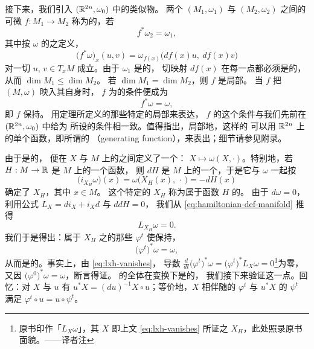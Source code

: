 接下来，我们引入 $(\mathbb{R}^{2n},\omega_0)$ 中\trSymplecticMapping{}的类似物。%
两个\trSymplecticManifold{} $(M_1,\omega_1)$ 与 $(M_2,\omega_2)$ 之间的%
可微\trMapping{} $f:M_1\to M_2$ 称为\trSymplectic{}的，若
\[
f^{*}\omega_2=\omega_1,
\]
其中按\trTwoForm{} $\omega$ 的\trPullback{}之定义，
\[
\bigl(f^{*}\omega\bigr)_x(u,v)=\omega_{f(x)}\bigl(df(x)u,\ df(x)v\bigr)
\]
对一切 $u$, $v\in T_xM$ 成立。由于 $\omega_1$ 是\trNondegenerate{}的，%
切映射 $df(x)$ 在每一点都必须是\trInjective{}的，从而 $\dim M_1\le\dim M_2$。%
若 $\dim M_1=\dim M_2$，则 $f$ 是局部\trDiffeomorphism。%
当 $f$ 把\trSymplecticManifold{} $(M,\omega)$ 映入其自身时，%
$f$ 为\trSymplectic{}的条件便成为
\[
f^{*}\omega=\omega,
\]
即 $f$ 保持\trSymplecticStructure。%
用\trDarboux{}定理所定义的那些特定的局部\trSymplecticCoordinates{}来表达，%
$f$ 的这个条件与我们先前在 $(\mathbb{R}^{2n},\omega_0)$ 中给\trMapping{}为\trSymplectic{}%
所设的条件相一致。值得指出，局部地，这样的\trSymplecticMapping%
可以用 $\mathbb{R}^{2n}$ 上的单个函数，即所谓的\textbf{\trGeneratingFunction}%
（generating function），来表出；细节请参见附录。

\trSymplecticStructure{}由于是\trNondegenerate{}的，%
便在\trVectorField{} $X$ 与 $M$ 上的\trOneForm{}之间定义了一个\trIsomorphism：%
$X\mapsto\omega(X,\cdot)$。特别地，若 $H:M\to\mathbb{R}$ 是 $M$ 上的一个\trSmooth{}函数，%
则 $dH$ 是 $M$ 上的一个\trOneForm，于是它与 $\omega$ 一起按
\begin{equation}\label{eq:hamiltonian-def-manifold}
\bigl(i_{X_H}\omega\bigr)(x)=\omega\bigl(X_H(x),\,\cdot\,\bigr)=-dH(x)
\end{equation}
确定了\trVectorField{} $X_H$，其中 $x\in M$。%
这个特定的\trVectorField{} $X_H$ 称为属于函数 $H$ 的\trHamiltonianVectorField。%
由于 $d\omega=0$，利用\trCartan{}公式 $L_X=di_X+i_Xd$ 与 $ddH=0$，%
我们从 \eqref{eq:hamiltonian-def-manifold} 推得
\begin{equation}\label{eq:lxh-vanishes}
L_{X_H}\omega=0.
\end{equation}
我们于是得出：属于\trHamiltonianVectorField{} $X_H$ 之\trFlow{}的那些\trMapping{} $\varphi^{t}$%
使\trSymplecticForm{}保持\trInvariant，
\begin{equation}\label{eq:flow-leaves-omega}
\bigl(\varphi^{t}\bigr)^{*}\omega=\omega,
\end{equation}
从而是\trSymplectic{}的。事实上，由 \eqref{eq:lxh-vanishes}，%
导数 $\frac{d}{dt}\bigl(\varphi^{t}\bigr)^{*}\omega=\bigl(\varphi^{t}\bigr)^{*}L_X\omega=0$\footnote{原书印作「$L_{X}\omega$」，其 $X$ 即上文 \eqref{eq:lxh-vanishes} 所证之 $X_{H}$，此处照录原书面貌。——译者注}为零，%
又因 $\bigl(\varphi^{0}\bigr)^{*}\omega=\omega$，断言得证。%
\trHamiltonianVectorField{}的全体在\trSymplectic{}变换下是\trInvariant{}的，%
我们接下来验证这一点。回忆：对\trVectorField{} $X$ 与\trDiffeomorphism{} $u$%
有 $u^{*}X=(du)^{-1}X\circ u$；等价地，$X$ 相伴随的\trFlow{} $\varphi^{t}$%
与 $u^{*}X$ 的\trFlow{} $\psi^{t}$ 满足 $\varphi^{t}\circ u=u\circ\psi^{t}$。

